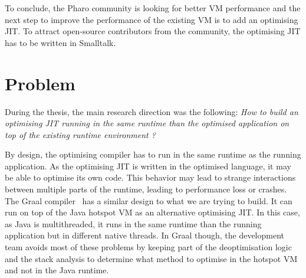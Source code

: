 \documentclass[a4paper,12pt,twoside]{../includes/ThesisStyle}
\begin{document}
	
To conclude, the Pharo community is looking for better VM performance and the next step to improve the performance of the existing VM is to add an optimising JIT. To attract open-source contributors from the community, the optimising JIT has to be written in Smalltalk.



\section{Problem}

During the thesis, the main research direction was the following:
\emph{How to build an optimising JIT running in the same runtime than the optimised application on top of the existing runtime environment ?} 

By design, the optimising compiler has to run in the same runtime as the running application. As the optimising JIT is written in the optimised language, it may be able to optimise its own code. This behavior may lead to strange interactions between multiple parts of the runtime, leading to performance loss or crashes. The Graal compiler~\cite{Dubo13c} has a similar design to what we are trying to build. It can run on top of the Java hotspot VM as an alternative optimising JIT. In this case, as Java is multithreaded, it runs in the same runtime than the running application but in different native threads. In Graal though, the development team avoids most of these problems by keeping part of the deoptimisation logic and the stack analysis to determine what method to optimise in the hotspot VM and not in the Java runtime. 
\end{document}
